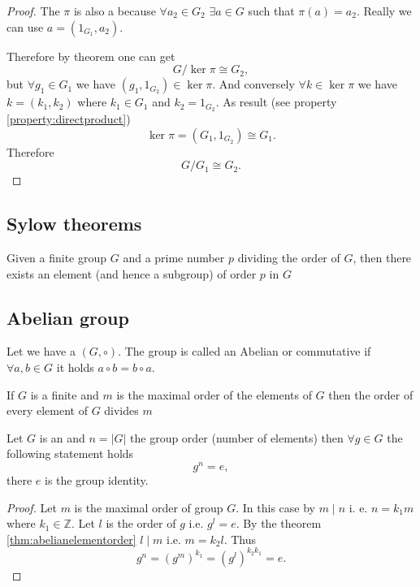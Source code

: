 \begin{appendices}
\begin{property}
\begin{proof}
    The $\pi$ is also a  because $\forall a_2
    \in G_2$ $\exists a \in G$ such that $\pi(a) = a_2$. Really we can
    use $a = (1_{G_1}, a_2)$.
    
    Therefore by  theorem one can get
    \[
    G/\ker{\pi} \cong G_2,
    \]
    but $\forall g_1 \in G_1$ we have $(g_1, 1_{G_2}) \in \ker{\pi}$.
    And conversely $\forall k \in \ker \pi$ we have $k = (k_1, k_2)$
    where $k_1 \in G_1$ and $k_2 = 1_{G_2}$.
    As result (see property \ref{property:directproduct})
    \[
    \ker \pi = \left(G_1, 1_{G_2}\right) \cong G_1.
    \]
    Therefore
    \[
    G/G_1 \cong G_2.
    \]
  \end{proof}
\end{property}

\subsection{Sylow theorems}

\begin{corollary}[Sylow]
  Given a finite group $G$ and a prime number $p$ dividing the order of $G$,
  then there exists an element (and hence a subgroup) of order $p$ in
  $G$ \cite{wiki:sylow}
  \label{cor:sylow}
\end{corollary}

\subsection{Abelian group}

\begin{definition}
  Let we have a  $\left(G, \circ\right)$.
  The group is called an Abelian or commutative if
  $\forall a, b \in G$ it holds $a \circ b = b \circ a$.
  \label{def:abeliangroup}
\end{definition}

\begin{theorem}
  If $G$ is a finite  and $m$ is the maximal
  order of the elements of $G$ then the order of every element of $G$
  divides $m$ 
  \label{thm:abelianelementorder}
\end{theorem}

\begin{theorem}
  Let $G$ is an  and $n = \left|G\right|$
  the group order (number of elements) then $\forall g \in G$ the
  following statement holds
  \[
  g^n = e,
  \]
  there $e$ is the group identity.
  \begin{proof}
    Let $m$ is the maximal order of group $G$. In this case by
     $m \mid n$ i. e. $n = k_1 m$ where $k_1 \in
    \mathbb{Z}$. Let $l$ is the order of $g$ i.e. $g^l = e$. By the
    theorem \ref{thm:abelianelementorder} $l \mid m$ i.e.
    $m = k_2 l$. Thus
    \[
    g^n = \left(g^m\right)^{k_1} = 
    \left(g^l\right)^{k_2 k_1} = e.
    \]
  \end{proof}
  \label{thm:abelianelement}
\end{theorem}


\end{appendices}
